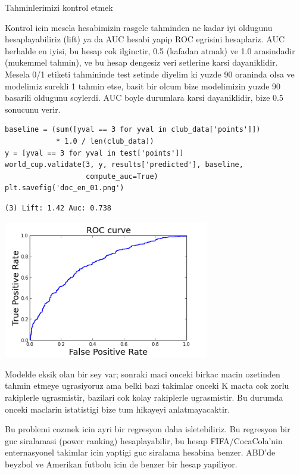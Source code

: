 \documentclass[12pt,fleqn]{article}\usepackage{../common}
\begin{document}
Tahminlerimizi kontrol etmek

Kontrol icin mesela hesabimizin rasgele tahminden ne kadar iyi oldugunu
hesaplayabiliriz (lift) ya da AUC hesabi yapip ROC egrisini hesaplariz. AUC
herhalde en iyisi, bu hesap cok ilginctir, 0.5 (kafadan atmak) ve 1.0
arasindadir (mukemmel tahmin), ve bu hesap dengesiz veri setlerine karsi
dayaniklidir. Mesela 0/1 etiketi tahmininde test setinde diyelim ki yuzde 90
oraninda olsa ve modelimiz surekli 1 tahmin etse, basit bir olcum bize
modelimizin yuzde 90 basarili oldugunu soylerdi. AUC boyle durumlara karsi
dayaniklidir, bize 0.5 sonucunu verir. 

\begin{verbatim}
baseline = (sum([yval == 3 for yval in club_data['points']]) 
            * 1.0 / len(club_data))
y = [yval == 3 for yval in test['points']]
world_cup.validate(3, y, results['predicted'], baseline, 
                   compute_auc=True)
plt.savefig('doc_en_01.png')
\end{verbatim}

\begin{verbatim}
(3) Lift: 1.42 Auc: 0.738
\end{verbatim}

\includegraphics[height=6cm]{doc_en_01.png}

Modelde eksik olan bir sey var; sonraki maci onceki birkac macin ozetinden
tahmin etmeye ugrasiyoruz ama belki bazi takimlar onceki K macta cok zorlu
rakiplerle ugrasmistir, bazilari cok kolay rakiplerle ugrasmistir. Bu
durumda onceki maclarin istatistigi bize tum hikayeyi anlatmayacaktir. 

Bu problemi cozmek icin ayri bir regresyon daha isletebiliriz. Bu regresyon
bir guc siralamasi (power ranking) hesaplayabilir, bu hesap
FIFA/CocaCola'nin enternasyonel takimlar icin yaptigi 
guc siralama hesabina benzer. ABD'de beyzbol ve Amerikan futbolu icin de
benzer bir hesap yapiliyor. 
\end{document}
